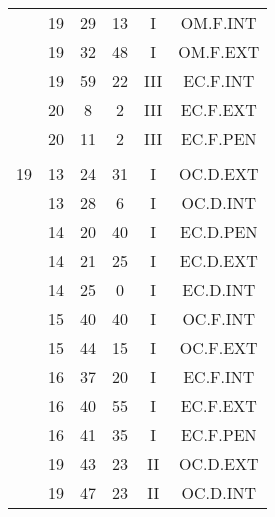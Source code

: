\documentclass[12pt, a4paper]{article}
\begin{document}
\begin{multicols}{3}
{\begin{tabular}{c c c c c c}
	 	 	 	 & 19 & 29 & 13 & I & OM.F.INT\\%
	 	 	 	 & 19 & 32 & 48 & I & OM.F.EXT\\%
	 	 	 	 & 19 & 59 & 22 & III & EC.F.INT\\%
	 	 	 	 & 20 & 8 & 2 & III & EC.F.EXT\\%
	 	 	 	 & 20 & 11 & 2 & III & EC.F.PEN\\%
	 	 	 	 & & & & & \\%
	 	 	 	19 & 13 & 24 & 31 & I & OC.D.EXT\\%
	 	 	 	 & 13 & 28 & 6 & I & OC.D.INT\\%
	 	 	 	 & 14 & 20 & 40 & I & EC.D.PEN\\%
	 	 	 	 & 14 & 21 & 25 & I & EC.D.EXT\\%
	 	 	 	 & 14 & 25 & 0 & I & EC.D.INT\\%
	 	 	 	 & 15 & 40 & 40 & I & OC.F.INT\\%
	 	 	 	 & 15 & 44 & 15 & I & OC.F.EXT\\%
	 	 	 	 & 16 & 37 & 20 & I & EC.F.INT\\%
	 	 	 	 & 16 & 40 & 55 & I & EC.F.EXT\\%
	 	 	 	 & 16 & 41 & 35 & I & EC.F.PEN\\%
	 	 	 	 & 19 & 43 & 23 & II & OC.D.EXT\\%
	 	 	 	 & 19 & 47 & 23 & II & OC.D.INT\\%
	 	 \end{tabular}
 	}
\end{multicols}
\end{document}
